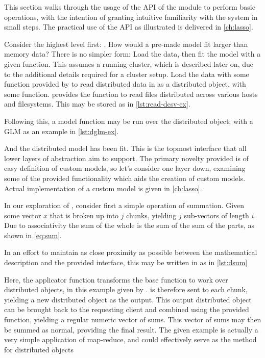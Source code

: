 This section walks through the usage of the API of the \lso{} module to perform basic operations, with the intention of granting intuitive familiarity with the system in small steps.
The practical use of the API as illustrated is delivered in \cref{ch:lasso}.

Consider the highest level first: \lsm{}.
How would a pre-made model fit larger than memory data?
There is no simpler form: Load the data, then fit the model with a given function.
This assumes a running cluster, which is described later on, due to the additional details required for a cluster setup.
Load the data with some function provided by \lso{} to read distributed data in as a distributed object, with some  function.
\lso{} provides the  function to read  files distributed across various hosts and filesystems.
This may be stored as in \cref{lst:read-dcsv-ex}.


Following this, a model function may be run over the distributed object; with a GLM as an example in \cref{lst:dglm-ex}.


And the distributed model has been fit.
This is the topmost interface that all lower layers of abstraction aim to support.
The primary novelty provided is of easy definition of custom models, so let's consider one layer down, examining some of the provided functionality which aids the creation of custom models.
Actual implementation of a custom model is given in \cref{ch:lasso}.

In our exploration of \lso{}, consider first a simple operation of summation.
Given some vector $x$ that is broken up into $j$ chunks, yielding $j$ sub-vectors of length $i$.
Due to associativity the sum of the whole is the sum of the sum of the parts, as shown in \cref{eq:sum}.


In an effort to maintain as close proximity as possible between the mathematical description and the provided interface, this may be written in \lso{} as in \cref{lst:dsum}


Here, the  applicator function transforms the base  function to work over distributed objects, in this example given by .
 is therefore sent to each chunk, yielding a new distributed object as the output.
This output distributed object can be brought back to the requesting client and combined using the provided  function, yielding a regular \R{} numeric vector of sums.
This vector of sums may then be summed as normal, providing the final result.
The given example is actually a very simple application of map-reduce, and could effectively serve as the  method for distributed objects

